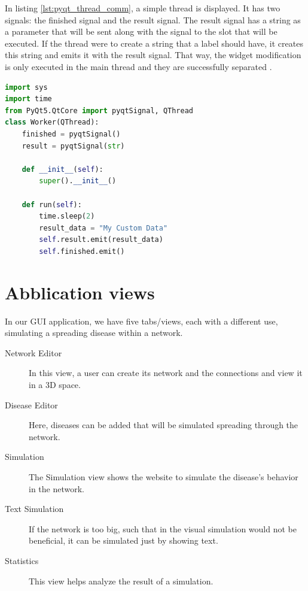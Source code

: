 In listing \ref{lst:pyqt_thread_comm}, a simple thread is displayed. It has two signals: the finished signal 
and the result signal. The result signal has a string as a parameter that will be sent along with the signal 
to the slot that will be executed. If the thread were to create a string that a label should have, it creates 
this string and emits it with the result signal. That way, the widget modification is only executed in the main 
thread and they are successfully separated \cite{pyqt}.

\begin{lstlisting}[language=python, caption={Thread example}, label={lst:pyqt_thread_comm}]
import sys
import time
from PyQt5.QtCore import pyqtSignal, QThread
class Worker(QThread):
    finished = pyqtSignal()
    result = pyqtSignal(str)

    def __init__(self):
        super().__init__()

    def run(self):
        time.sleep(2)
        result_data = "My Custom Data"
        self.result.emit(result_data)
        self.finished.emit()
\end{lstlisting}


\section{Abblication views}
\label{sub:thread_views}
In our GUI application, we have five tabs/views, each with a different use, simulating a spreading disease within a network.
\begin{description}
    \item[Network Editor] In this view, a user can create its network and the connections and view it in a 3D space.
    \item[Disease Editor] Here, diseases can be added that will be simulated spreading through the network.
    \item[Simulation] The Simulation view shows the website to simulate the disease's behavior in the network.
    \item[Text Simulation] If the network is too big, such that in the visual simulation would not be beneficial, it can be simulated just by showing text.
    \item[Statistics] This view helps analyze the result of a simulation.
\end{description}
